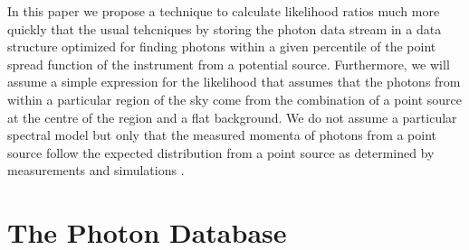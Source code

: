 \documentclass[useAMS,usenatbib]{mn2e}
\begin{document}
In this paper we propose a technique to calculate likelihood ratios
much more quickly that the usual tehcniques by storing the photon data
stream in a data structure optimized for finding photons within a
given percentile of the point spread function of the instrument from a
potential source.  Furthermore, we will assume a simple expression for
the likelihood that assumes that the photons from within a particular
region of the sky come from the combination of a point source at the
centre of the region and a flat background.
We do not assume a particular spectral model but only that the
measured momenta of photons from a point source follow the expected
distribution from a point source as determined by measurements and
simulations \citep{2013ApJ...765...54A}.

\section{The Photon Database}
\label{sec:photon-database}
\end{document}
